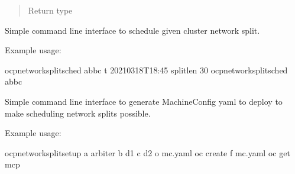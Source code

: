 \documentclass[letterpaper,10pt,english]{sphinxmanual}
\begin{document}
\begin{fulllineitems}
\begin{quote}
\begin{description}
\begin{description}
\end{description}


\item[{Return type}] \leavevmode
{\hyperref[\detokenize{ocpnetsplit:ocpnetsplit.zone.ZoneConfig}]{}}

\end{description}\end{quote}

\end{fulllineitems}


\begin{fulllineitems}
\label{\detokenize{ocpnetsplit:ocpnetsplit.main.main_sched}}
Simple command line interface to schedule given cluster network split.

Example usage:

\begin{sphinxVerbatim}[commandchars=\\\{\}]
\PYGZdl{} ocp\PYGZhy{}network\PYGZhy{}split\PYGZhy{}sched ab\PYGZhy{}bc \PYGZhy{}t 2021\PYGZhy{}03\PYGZhy{}18T18:45 \PYGZhy{}\PYGZhy{}split\PYGZhy{}len 30
\PYGZdl{} ocp\PYGZhy{}network\PYGZhy{}split\PYGZhy{}sched ab\PYGZhy{}bc
\end{sphinxVerbatim}

\end{fulllineitems}


\begin{fulllineitems}
\label{\detokenize{ocpnetsplit:ocpnetsplit.main.main_setup}}
Simple command line interface to generate MachineConfig yaml to deploy to
make scheduling network splits possible.

Example usage:

\begin{sphinxVerbatim}[commandchars=\\\{\}]
\PYGZdl{} ocp\PYGZhy{}network\PYGZhy{}split\PYGZhy{}setup \PYGZhy{}a arbiter \PYGZhy{}b d1 \PYGZhy{}c d2 \PYGZhy{}o mc.yaml
\PYGZdl{} oc create \PYGZhy{}f mc.yaml
\PYGZdl{} oc get mcp
\end{sphinxVerbatim}

\end{fulllineitems}
\end{document}
